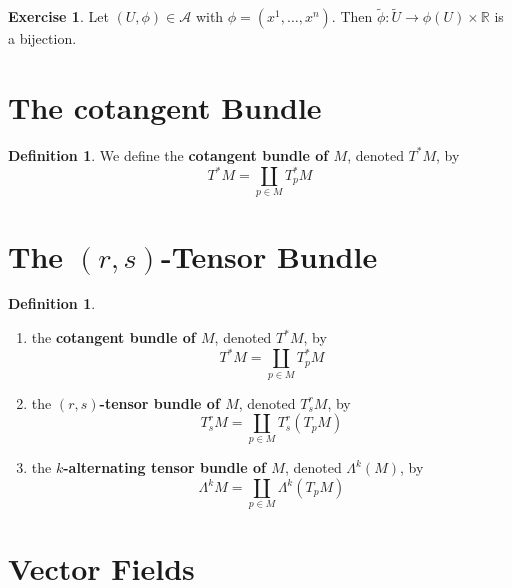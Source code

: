 \documentclass{book}
\theoremstyle{definition}
\newtheorem{defn}[definition]{Definition}
\newtheorem{ex}[definition]{Exercise}
\newcommand{\Lam}{\Lambda}
\newcommand{\R}{\mathbb{R}}
\newcommand{\MA}{\mathcal{A}}
\newcommand{\tU}{\tilde{U}}
\newcommand{\tphi}{\tilde{\phi}}
\DeclareMathOperator*{\0}{\mbf{0}}
\DeclareMathOperator*{\1}{\mbf{1}}
\newcommand{\tbf}[1]{\textbf{#1}}
\begin{document}
	\begin{ex}
		Let $(U, \phi) \in \MA$ with $\phi = (x^1, \dots, x^n)$. Then $\tphi:\tU \rightarrow \phi(U) \times \R$ is a bijection. 
	\end{ex}














	\newpage
	\section{The cotangent Bundle}
	
	\begin{defn}
		We define the \tbf{cotangent bundle of $M$}, denoted $T^*M$, by 
		$$T^*M = \coprod_{p \in M} T_p^*M$$ 
	\end{defn}





	
	
	
	
	
	
	
	
	
	
	\section{The $(r,s)$-Tensor Bundle}
	
	\begin{defn}
	\begin{enumerate}
		\item the \tbf{cotangent bundle of $M$}, denoted $T^*M$, by 
		$$T^*M = \coprod_{p \in M} T_p^*M$$
		\item the \tbf{$(r,s)$-tensor bundle of $M$}, denoted $T^r_sM$, by
	$$T^r_s M = \coprod_{p \in M} T^r_s(T_p M)$$
	\item the \tbf{$k$-alternating tensor bundle of $M$}, denoted $\Lam^k(M)$, by
	$$\Lam^kM = \coprod_{p \in M} \Lam^k(T_pM)$$
		\end{enumerate}
	\end{defn}
	
	
	
	
	
	
	
	
	
	
	
	
	
	
	\newpage	
	\section{Vector Fields}
	
\end{document}
